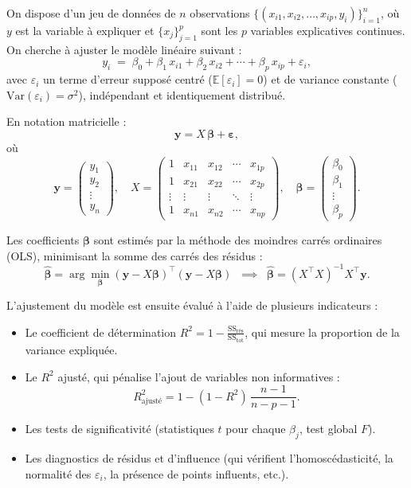 \documentclass[12pt,a4paper]{article}
\begin{document}
On dispose d’un jeu de données de \(n\) observations \(\{(x_{i1}, x_{i2}, \dots, x_{ip}, y_i)\}_{i=1}^n\), où \(y\) est la variable à expliquer et \(\{x_j\}_{j=1}^p\) sont les \(p\) variables explicatives continues. On cherche à ajuster le modèle linéaire suivant :
\[
y_i \;=\;\beta_0 + \beta_1\,x_{i1} + \beta_2\,x_{i2} + \cdots + \beta_p\,x_{ip} + \varepsilon_i,
\]
avec \(\varepsilon_i\) un terme d’erreur supposé centré (\(\mathbb{E}[\varepsilon_i]=0\)) et de variance constante (\(\mathrm{Var}(\varepsilon_i)=\sigma^2\)), indépendant et identiquement distribué.

En notation matricielle :
\[
\mathbf{y} = X\,\boldsymbol{\beta} + \boldsymbol{\varepsilon},
\]
où
\[
\mathbf{y} = 
\begin{pmatrix}
y_1 \\ y_2 \\ \vdots \\ y_n
\end{pmatrix},\quad
X = 
\begin{pmatrix}
1 & x_{11} & x_{12} & \cdots & x_{1p} \\
1 & x_{21} & x_{22} & \cdots & x_{2p} \\
\vdots & \vdots & \vdots & \ddots & \vdots \\
1 & x_{n1} & x_{n2} & \cdots & x_{np}
\end{pmatrix},\quad
\boldsymbol{\beta} = 
\begin{pmatrix}
\beta_0 \\ \beta_1 \\ \vdots \\ \beta_p
\end{pmatrix}.
\]

Les coefficients \(\boldsymbol{\beta}\) sont estimés par la méthode des moindres carrés ordinaires (OLS), minimisant la somme des carrés des résidus :
\[
\hat{\boldsymbol{\beta}}
= \arg\min_{\boldsymbol{\beta}}
(\mathbf{y} - X\boldsymbol{\beta})^\top(\mathbf{y} - X\boldsymbol{\beta})
\;\;\implies\;\;
\hat{\boldsymbol{\beta}} = (X^\top X)^{-1} X^\top \mathbf{y}.
\]

L’ajustement du modèle est ensuite évalué à l’aide de plusieurs indicateurs :
\begin{itemize}
  \item Le coefficient de détermination \(R^2 = 1 - \tfrac{\mathrm{SS}_{\mathrm{rés}}}{\mathrm{SS}_{\mathrm{tot}}}\), qui mesure la proportion de la variance expliquée.
  \item Le \(R^2\) ajusté, qui pénalise l’ajout de variables non informatives :
    \[
      R^2_{\mathrm{ajusté}} = 1 - (1-R^2)\,\frac{n-1}{n-p-1}.
    \]
  \item Les tests de significativité (statistiques \(t\) pour chaque \(\beta_j\), test global \(F\)).
  \item Les diagnostics de résidus et d’influence (qui vérifient l’homoscédasticité, la normalité des \(\varepsilon_i\), la présence de points influents, etc.).
\end{itemize}
\end{document}
